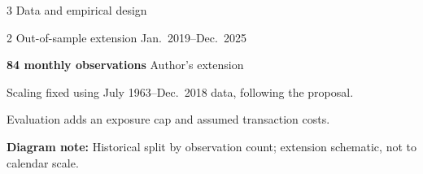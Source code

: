 \documentclass[aspectratio=169,10pt]{beamer}
\begin{document}
\begin{frame}{3 \quad Data and empirical design}
\vspace{.04cm}


\begin{block}{
  2 \quad Out-of-sample extension
  \hfill
  \small Jan.\ 2019--Dec.\ 2025
}

\small
\textbf{84 monthly observations}
\hfill
{\scriptsize Author's extension}

\vspace{.04cm}


\vspace{.04cm}

{\scriptsize
Scaling fixed using July 1963--Dec.\ 2018 data, following the proposal.\par
Evaluation adds an exposure cap and assumed transaction costs.
}

\end{block}

\vspace{.04cm}

{\color{gray}\fontsize{7.5}{9}\selectfont
\textbf{Diagram note:}
Historical split by observation count; extension schematic, not to calendar scale.
\par}
\end{frame}
\end{document}
